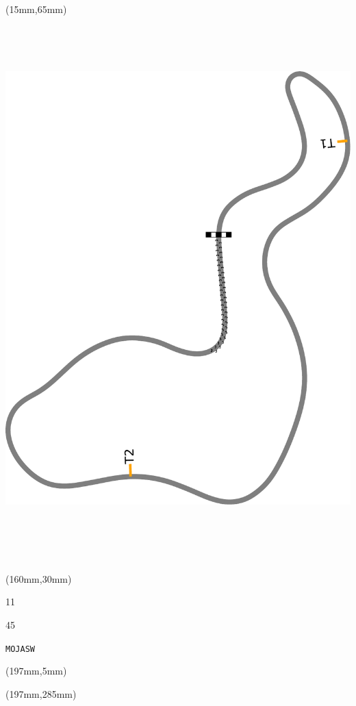 \begin{textblock*}{185mm}(15mm,65mm)%
\centering
\mbox{\includegraphics[width=185mm,height=210mm,keepaspectratio]{PT/MOJASW.pdf}}
\end{textblock*}
\begin{textblock*}{40mm}(160mm,30mm)%
\Large
\par{} 
\par11 
\par45 
\par\hfill\tiny\tt MOJASW\\
\end{textblock*}
\begin{textblock*}{20mm}(197mm,5mm)%
\fbox{\thepage}
\label{MOJASW}
\end{textblock*}
\begin{textblock*}{20mm}(197mm,285mm)%
\fbox{\thepage}
\end{textblock*}

